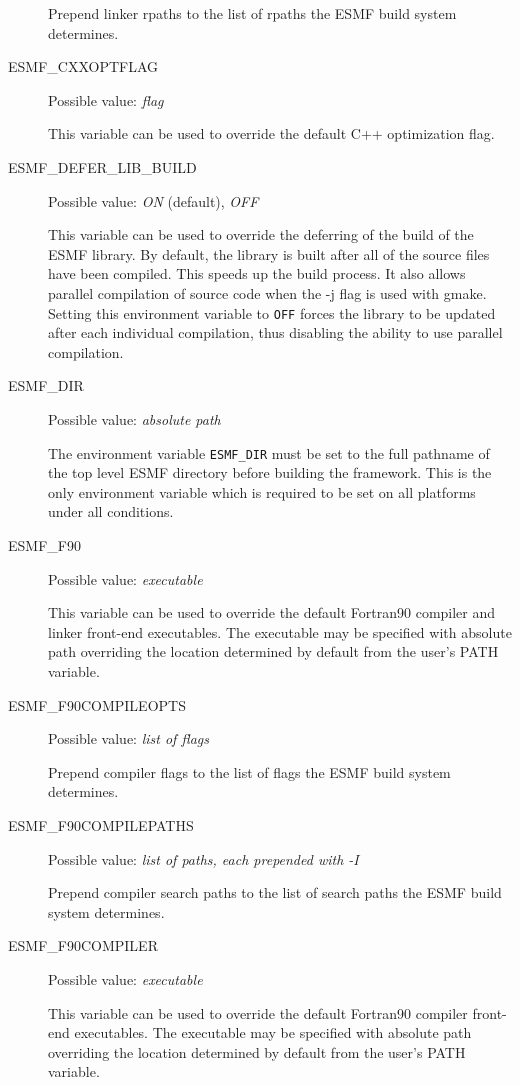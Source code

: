 \begin{description}
Prepend linker rpaths to the list of rpaths the ESMF build system determines.

\item[ESMF\_CXXOPTFLAG]
Possible value: {\em flag}

This variable can be used to override the default C++ optimization flag.

\item[ESMF\_DEFER\_LIB\_BUILD]
Possible value: {\em ON} (default), {\em OFF}

This variable can be used to override the deferring of the build of the
ESMF library.  By default, the library is built after all of the source
files have been compiled.  This speeds up the build process. It also
allows parallel compilation of source code when the -j flag is used with
gmake.  Setting this environment variable to {\tt OFF} forces the library to
be updated after each individual compilation, thus disabling the ability
to use parallel compilation.

\item[ESMF\_DIR]
Possible value: {\em absolute path}

The environment variable {\tt ESMF\_DIR} must be set to the full pathname 
of the top level ESMF directory before building the framework. This is the 
only environment variable which is required to be set on all platforms under 
all conditions.

\item[ESMF\_F90]
Possible value: {\em executable}

This variable can be used to override the default Fortran90 compiler and linker
front-end executables. The executable may be specified with absolute path
overriding the location determined by default from the user's PATH variable.

\item[ESMF\_F90COMPILEOPTS]
Possible value: {\em list of flags}

Prepend compiler flags to the list of flags the ESMF build system determines.

\item[ESMF\_F90COMPILEPATHS]
Possible value: {\em list of paths, each prepended with -I}

Prepend compiler search paths to the list of search paths the ESMF build system
determines.

\item[ESMF\_F90COMPILER]
Possible value: {\em executable}

This variable can be used to override the default Fortran90 compiler
front-end executables. The executable may be specified with absolute path
overriding the location determined by default from the user's PATH variable.


\end{description}
